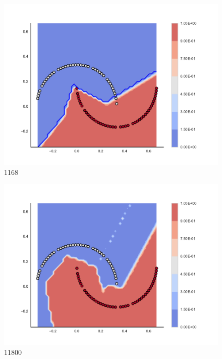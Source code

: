 \begin{subfigure}[b]{0.09\textwidth}
    \includegraphics[clip, trim=2.35cm 1.75cm 4.5cm 0cm,width=\textwidth]{img/convergence/1168.pdf}
    \caption{1168}
    \label{fig:convergence_1168}
\end{subfigure}
%
\begin{subfigure}[b]{0.09\textwidth}
    \includegraphics[clip, trim=2.35cm 1.75cm 4.5cm 0cm,width=\textwidth]{img/convergence/11800.pdf}
    \caption{11800}
    \label{fig:convergence_11800}
\end{subfigure}
%
